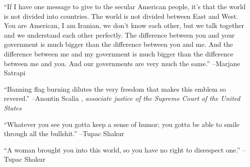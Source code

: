 \documentclass{article}%
\begin{document}
\linebreak%
\vspace{1mm}%
\begin{minipage}{\textwidth}%
\flushleft%
“If I have one message to give to the secular American people, it's that the world is not divided into countries. The world is not divided between East and West. You are American, I am Iranian, we don't know each other, but we talk together and we understand each other perfectly. The difference between you and your government is much bigger than the difference between you and me. And the difference between me and my government is much bigger than the difference between me and you. And our governments are very much the same.”%
\linebreak%
\vspace{1mm}%
–Marjane Satrapi%
\linebreak%
\vspace{1mm}%
\end{minipage}%
\linebreak%
\vspace{1mm}%
\begin{minipage}{\textwidth}%
\flushleft%
“Banning flag burning dilutes the very freedom that makes this emblem so revered.”%
\linebreak%
\vspace{1mm}%
–Anontin Scalia%
, \textit{associate justice of the Supreme Court of the United States}%
\linebreak%
\vspace{1mm}%
\end{minipage}%
\linebreak%
\vspace{1mm}%
\begin{minipage}{\textwidth}%
\flushleft%
“Whatever you see you gotta keep a sense of humor; you gotta be able to smile through all the bullshit.”%
\linebreak%
\vspace{1mm}%
–Tupac Shakur%
\linebreak%
\vspace{1mm}%
\end{minipage}%
\linebreak%
\vspace{1mm}%
\begin{minipage}{\textwidth}%
\flushleft%
“A woman brought you into this world, so you have no right to disrespect one.”%
\linebreak%
\vspace{1mm}%
–Tupac Shakur%
\linebreak%
\vspace{1mm}%
\end{minipage}%
\end{document}
